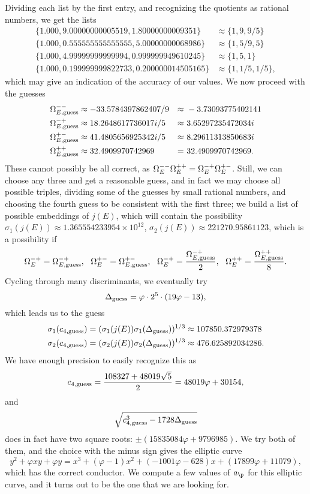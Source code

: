 \documentclass{amsart}
\begin{document}
Dividing each list by the first entry, and recognizing the quotients as rational
numbers, we get the lists
\[
\begin{split}
       \{1.000, 9.00000000005519, 1.80000000009351\}  &\approx \{1, 9, 9/5\}\\
       \{1.000, 0.555555555555555, 5.00000000068986 \} &\approx \{1, 5/9, 5\}\\
       \{1.000, 4.99999999999994, 0.999999949610245 \}  &\approx \{1, 5, 1\} \\ 
       \{1.000, 0.199999999822733, 0.200000014505165 \} &\approx \{1, 1/5, 1/5\},
\end{split}
\]
which may give an indication of the accuracy of our values. We now proceed with
the guesses
\begin{align*}
\phantom{MMMMM} \Omega^{--}_{E, \mathrm{guess}} &\approx -33.5784397862407/9 &\approx&\  -3.73093775402141 \phantom{MMMMM} \\
    \Omega^{-+}_{E, \mathrm{guess}} &\approx 18.2648617736017i/5 &\approx&\  3.65297235472034i \\
    \Omega^{+-}_{E, \mathrm{guess}} &\approx 41.4805656925342i/5 &\approx&\  8.29611313850683i \\
    \Omega^{++}_{E, \mathrm{guess}} &\approx 32.4909970742969    &=&\  32.4909970742969.
\end{align*}
These cannot possibly be all correct, as $\Omega^{--}_E \Omega^{++}_E = \Omega^{-+}_E \Omega^{+-}_E$.
Still, we can choose any three and get a reasonable guess, and in fact we may choose all
possible triples, dividing some of the guesses by small rational numbers, and choosing the
fourth guess to be consistent with the first three; we build a list of possible embeddings
of $j(E)$, which will contain the possibility $\sigma_1(j(E)) \approx 1.365554233954 \times 10^{12}$,
$\sigma_2(j(E)) \approx 221270.95861123$, which is a possibility if 
\[\Omegamp_E = \OmegampEguess,\ \ 
\Omegapm_E = \OmegapmEguess,\ \ \Omegamp_E = \frac{\OmegampEguess}{2},\ \ \Omegapp_E = \frac{\OmegappEguess}{8}.\]
Cycling through many discriminants, we eventually try
\[
    \Delta_{\textrm{guess}} = \varphi \cdot 2^5 \cdot (19\varphi - 13),
\]
which leads us to the guess
\begin{align*}
    \sigma_1(c_{4,\textrm{guess}}) &= (\sigma_1(j(E)) \sigma_1(\Delta_{\textrm{guess}}))^{1/3} \approx 107850.372979378 \\
    \sigma_2(c_{4,\textrm{guess}}) &= (\sigma_2(j(E)) \sigma_2(\Delta_{\textrm{guess}}))^{1/3} \approx 476.625892034286.
\end{align*}
We have enough precision to easily recognize this as
\[
    c_{4,\textrm{guess}} = \frac{108327 + 48019 \sqrt5}{2} = 48019\varphi + 30154,
\]
and
\[
    \sqrt{c_{4,\textrm{guess}}^3 - 1728\Delta_{\textrm{guess}}}
\]
does in fact have two square roots: $\pm(15835084\varphi + 9796985)$. We try both of them, and
the choice with the minus sign gives the elliptic curve
\[
y^2 + \varphi xy + \varphi y = x^3 + \left(\varphi - 1\right)x^2 + \left(-1001 \varphi - 628\right)x + \left(17899 \varphi + 11079\right),
\]
which has the correct conductor. We compute a few values of $a_\p$ for this elliptic curve, and it turns
out to be the one that we are looking for.
\end{document}
